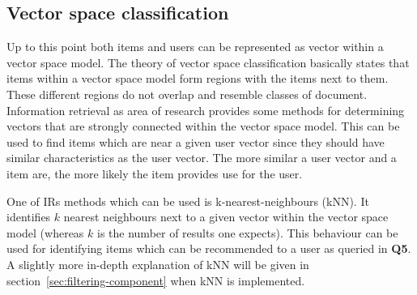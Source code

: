 \subsection{Vector space classification}
Up to this point both items and users can be represented as vector within a vector space model.
The theory of vector space classification basically states that items within a vector space model form regions with the items next to them.
These different regions do not overlap and resemble classes of document.
\citep[p.~298-291]{manning:2009}
Information retrieval as area of research provides some methods for determining vectors that are strongly connected within the vector space model.
This can be used to find items which are near a given user vector since they should have similar characteristics as the user vector.
The more similar a user vector and a item are, the more likely the item provides use for the user.
\citep[p.~298-291]{manning:2009}

One of IRs methods which can be used is k-nearest-neighbours (kNN).
It identifies $k$ nearest neighbours next to a given vector within the vector space model (whereas $k$ is the number of results one expects).
This behaviour can be used for identifying items which can be recommended to a user as queried in \textbf{Q5}.
A slightly more in-depth explanation of kNN will be given in section~\ref{sec:filtering-component} when kNN is implemented.
%
